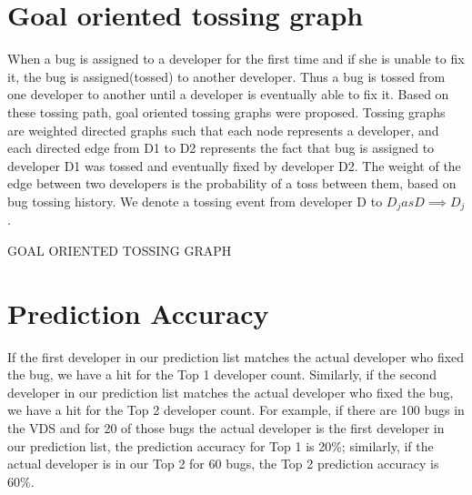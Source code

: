 \section{Goal oriented tossing graph}
When a bug is assigned to a developer for the first time and if she is unable to fix it, the bug is assigned(tossed) to another developer. Thus a bug is tossed from one developer to another until a developer is eventually able to fix it. Based on these tossing path, goal oriented tossing graphs were proposed. Tossing graphs are weighted directed graphs such that each node represents a developer, and each directed edge from D1 to D2 represents the fact that bug is assigned to developer D1 was tossed and eventually fixed by developer D2. The weight of the edge between two developers is the probability of a toss between them, based on bug tossing history. We denote a tossing event from developer D to $D_j  as D \implies D_j$.

\newpage
\begin{table}[hbt]
\begin{center}

\caption{GOAL ORIENTED TOSSING GRAPH}
\end{center}
\end{table} 

\newpage
\section{Prediction Accuracy}

If the first developer in our prediction list matches the actual developer who fixed the bug, we have a hit for the Top 1 developer count. Similarly, if the second developer in our prediction list matches the actual developer who fixed the bug, we have a hit for the Top 2 developer count. For example, if there are 100 bugs in the VDS and for 20 of those bugs the actual developer is the first developer in our prediction list, the prediction accuracy for Top 1 is 20\%; similarly, if the actual developer is in our Top 2 for
60 bugs, the Top 2 prediction accuracy is 60\%.
